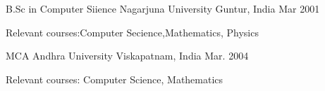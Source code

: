\begin{cventries}
  \cventry
    {B.Sc in Computer Siience}
    {Nagarjuna University}
    {Guntur, India}
    {Mar 2001}
    {
      \begin{cvitems}
        \item {Relevant courses:Computer Secience,Mathematics, Physics}
      \end{cvitems}
    }
    \cventry
    {MCA }
    {Andhra University}
    {Viskapatnam, India}
    {Mar. 2004}
    {
        \begin{cvitems}
            \item {Relevant courses: Computer Science, Mathematics}
        \end{cvitems}
    }
    
\end{cventries}
